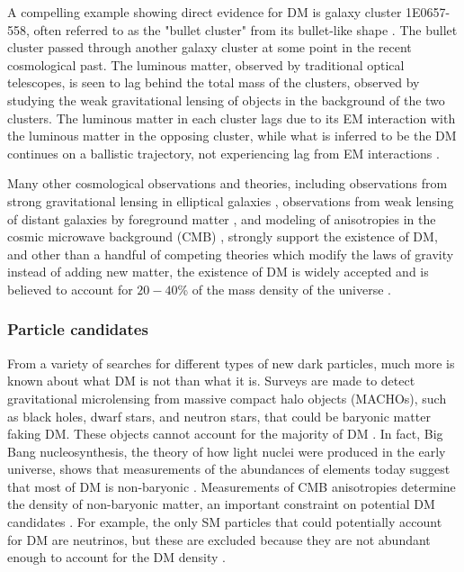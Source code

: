 \indent A compelling example showing direct evidence for DM is galaxy cluster 1E0657-558, often referred to as the "bullet cluster" from its bullet-like shape \cite{Clowe:2003tk}. The bullet cluster passed through another galaxy cluster at some point in the recent cosmological past. The luminous matter, observed by traditional optical telescopes, is seen to lag behind the total mass of the clusters, observed by studying the weak gravitational lensing of objects in the background of the two clusters. The luminous matter in each cluster lags due to its EM interaction with the luminous matter in the opposing cluster, while what is inferred to be the DM continues on a ballistic trajectory, not experiencing lag from EM interactions \cite{Agashe:2014kda}. 

Many other cosmological observations and theories, including observations from strong gravitational lensing in elliptical galaxies \cite{Koopmans:2002qh}, observations from weak lensing of distant galaxies by foreground matter \cite{Hoekstra:2002nf}, and modeling of anisotropies in the cosmic microwave background (CMB) \cite{Hu:2001bc, Hu:1996qs}, strongly support the existence of DM, and other than a handful of competing theories which modify the laws of gravity instead of adding new matter, the existence of DM is widely accepted \cite{Bertone:2004pz} and is believed to account for $20-40$\% of the mass density of the universe \cite{Bergstrom:2000pn}.

\subsubsection{Particle candidates}

From a variety of searches for different types of new dark particles, much more is known about what DM is not than what it is. Surveys are made to detect gravitational microlensing from massive compact halo objects (MACHOs), such as black holes, dwarf stars, and neutron stars, that could be baryonic matter faking DM. These objects cannot account for the majority of DM \cite{Tisserand:2006zx, Wyrzykowski:2011tr}. In fact, Big Bang nucleosynthesis, the theory of how light nuclei were produced in the early universe, shows that measurements of the abundances of elements today suggest that most of DM is non-baryonic \cite{Copi:1994ev}. Measurements of CMB anisotropies determine the density of non-baryonic matter, an important constraint on potential DM candidates \cite{Agashe:2014kda}. For example, the only SM particles that could potentially account for DM are neutrinos, but these are excluded because they are not abundant enough to account for the DM density \cite{Bertone:2004pz}. 

